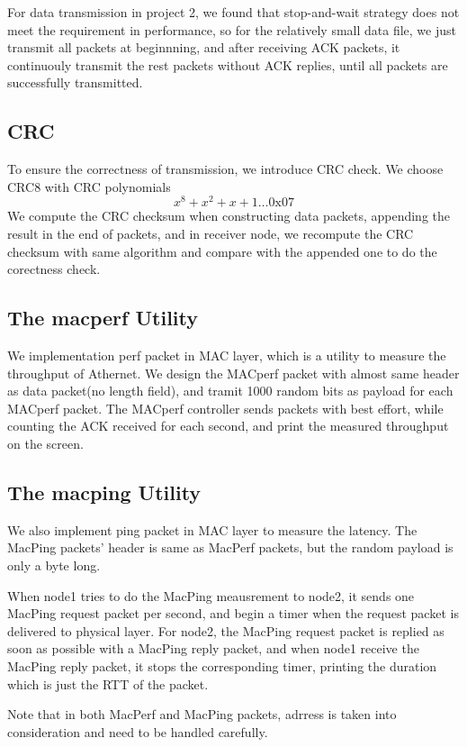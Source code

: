 \documentclass[11pt, conference]{IEEEtran}
\begin{document}
For data transmission in project 2, we found that stop-and-wait strategy does not meet the requirement in performance, so for the relatively small data file, we just transmit all
packets at beginnning, and after receiving ACK packets, it continuouly transmit the rest packets without ACK replies, until all packets are successfully transmitted.

\subsection{CRC}
To ensure the correctness of transmission, we introduce CRC check. We choose CRC8 with CRC polynomials
\[
    x^8 + x^2 + x + 1 \dots 0\text{x}07
\]
We compute the CRC checksum when constructing data packets, appending the result in the end of packets, and in receiver node, we recompute the CRC checksum with same algorithm and compare with the appended one to do the corectness check.
\subsection{The \textsf{macperf} Utility}
We implementation perf packet in MAC layer, which is a utility to measure the throughput of Athernet. We design the MACperf packet with almost same header as data packet(no length field), and tramit 1000 random bits as 
payload for each MACperf packet. The MACperf controller sends packets with best effort, while counting the ACK received for each second, and print the measured throughput on the screen.

\subsection{The \textsf{macping} Utility}

We also implement ping packet in MAC layer to measure the latency. The MacPing packets' header is same as MacPerf packets, but the random payload is only a byte long.

When node1 tries to do the MacPing meausrement to node2, it sends one MacPing request packet per second, and begin a timer when the request packet is delivered to physical layer. For node2, the MacPing request packet is replied
as soon as possible with a MacPing reply packet, and when node1 receive the MacPing reply packet, it stops the corresponding timer, printing the duration which is just the RTT of the packet.

Note that in both MacPerf and MacPing packets, adrress is taken into consideration and need to be handled carefully.
\end{document}
